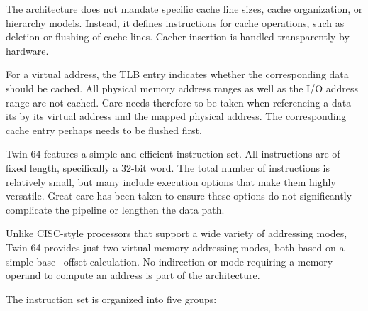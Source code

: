 The architecture does not mandate specific cache line sizes, cache organization, or hierarchy models. Instead, it defines instructions for cache operations, such as deletion or flushing of cache lines. Cacher insertion is handled transparently by hardware.

For a virtual address, the TLB entry indicates whether the corresponding data should be cached. All physical memory address ranges as well as the I/O address range are not cached. Care needs therefore to be taken when referencing a data its by its virtual address and the mapped physical address. The corresponding cache entry perhaps needs to be flushed first. 


Twin-64 features a simple and efficient instruction set. All instructions are of fixed length, specifically a 32-bit word. The total number of instructions is relatively small, but many include execution options that make them highly versatile. Great care has been taken to ensure these options do not significantly complicate the pipeline or lengthen the data path.  

Unlike CISC-style processors that support a wide variety of addressing modes, Twin-64 provides just two virtual memory addressing modes, both based on a simple base–-offset calculation. No indirection or mode requiring a memory operand to compute an address is part of the architecture.

The instruction set is organized into five groups:  

